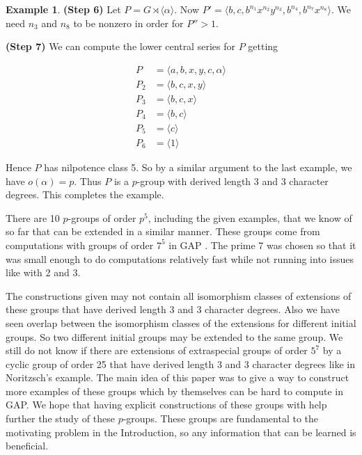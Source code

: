 \documentclass[]{amsart}
\theoremstyle{definition}
\theoremstyle{definition}
\theoremstyle{definition}
\newtheorem{ex}[theorem]{Example}
\theoremstyle{definition}
\theoremstyle{remark}
\theoremstyle{remark}
\begin{document}
\begin{ex}
            \textbf{(Step 6)} Let $P=G\rtimes \langle \alpha \rangle$. Now $P'=\langle b,c, b^{n_1}x^{n_2}y^{n_3}, b^{n_4}, b^{n_7}x^{n_8} \rangle$. We need $n_3$ and $n_8$ to be nonzero in order for $P''>1$. 

            \textbf{(Step 7)} We can compute the lower central series for $P$ getting

            \begin{align*}
                P&=\langle a,b,x,y,c,\alpha \rangle\\
                P_2&=\langle b,c,x,y \rangle\\
                P_3&=\langle b,c,x \rangle\\
                P_4&=\langle b,c \rangle\\
                P_5&=\langle c \rangle\\
                P_6&=\langle 1 \rangle
            \end{align*}

            Hence $P$ has nilpotence class 5. So by a similar argument to the last example, we have $o(\alpha)=p$. Thus $P$ is a $p$-group with derived length 3 and 3 character degrees. This completes the example.
        \end{ex}

        There are 10 $p$-groups of order $p^5$, including the given examples, that we know of so far that can be extended in a similar manner. These groups come from computations with groups of order $7^5$ in  GAP \cite{GAP4}. The prime 7 was chosen so that it was small enough to do computations relatively fast while not running into issues like with 2 and 3. 

        The constructions given may not contain all isomorphism classes of extensions of these groups that have derived length 3 and 3 character degrees. Also we have seen overlap between the isomorphism classes of the extensions for different initial groups. So two different initial groups may be extended to the same group. We still do not know if there are extensions of extraspecial groups of order $5^7$ by a cyclic group of order 25 that have derived length 3 and 3 character degrees like in Noritzsch's example. The main idea of this paper was to give a way to construct more examples of these groups which by themselves can be hard to compute in GAP. We hope that having explicit constructions of these groups with help further the study of these $p$-groups. These groups are fundamental to the motivating problem in the Introduction, so any information that can be learned is beneficial.

        


\end{document}
